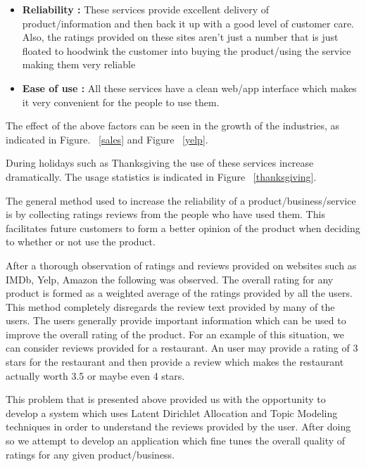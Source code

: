 \documentclass{article}
\begin{document}
	\begin{itemize}
		\item{\textbf{Reliability :} These services provide excellent delivery of product/information and then back it up with a 
		good level of customer care. Also, the ratings provided on these sites aren't just a number that is just floated 
		to hoodwink the customer into buying the product/using the service making them very reliable}
		\item{\textbf{Ease of use :} All these services have a clean web/app interface which makes it very convenient for the 
		people to use them. }
\end{itemize}
The effect of the above factors can be seen in the growth of the industries, as indicated in Figure. ~\ref{sales} and Figure ~\ref{yelp}.

During holidays such as Thanksgiving the use of these services increase dramatically. The usage statistics is indicated in Figure ~\ref{thanksgiving}.

The general method used to increase the reliability of a product/business/service is by collecting ratings reviews from the people who have used them. This facilitates future customers to form a better opinion of the product when deciding to whether or not use the product.  

After a thorough observation of ratings and reviews provided on websites such as IMDb, Yelp, Amazon the following was observed. The overall rating for any product is formed as a weighted average of the ratings provided by all the users. This method completely disregards the review text provided by many of the users.  The users generally provide important information which can be used to improve the overall rating of the product. For an example of this situation, we can consider reviews provided for a restaurant. An user may provide a rating of 3 stars for the restaurant and then provide a review which makes the restaurant actually worth 3.5 or maybe even 4 stars. 

This problem that is presented above provided us with the opportunity to develop a system which uses Latent Dirichlet Allocation and Topic Modeling techniques in order to understand the reviews provided by the user. After doing so we attempt to develop an application which fine tunes the overall quality of ratings for any given product/business. 
\end{document}
